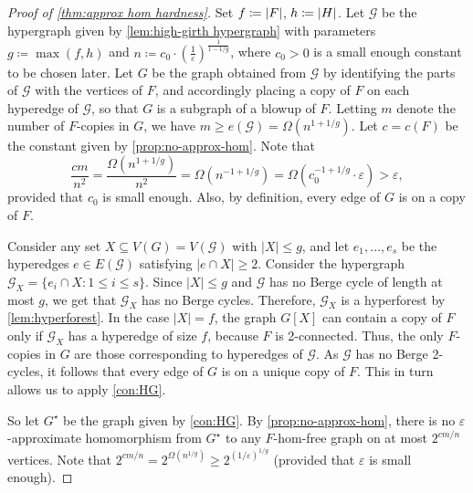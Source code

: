 \documentclass[10pt,a4paper]{amsart}
\DeclarePairedDelimiter{\abs}{\lvert}{\rvert}
\renewcommand{\geq}{\geqslant}
\renewcommand{\leq}{\leqslant}
\begin{document}
	\begin{proof}[Proof of \cref{thm:approx hom hardness}]
	Set $f \coloneqq \abs F$, $h \coloneqq \abs H$.
	Let $\mathcal{G}$ be the hypergraph given by \cref{lem:high-girth hypergraph} with parameters $g \coloneqq \max(f,h)$ and $n \coloneqq c_0\cdot (\frac{1}{\varepsilon})^{\frac{1}{1-1/g}}$, where $c_0 > 0$ is a small enough constant to be chosen later. 
	{Let $G$ be the graph obtained from $\mathcal{G}$ by identifying the parts of $\mathcal{G}$ with the vertices of $F$, and accordingly placing a copy of $F$ on each hyperedge of $\mathcal{G}$, so that $G$ is a subgraph of a blowup of $F$.} 
	Letting $m$ denote the number of $F$-copies in $G$, we have $m \geq e(\mathcal G)= \Omega(n^{1 + 1/g})$. 
	Let $c = c(F)$ be the constant given by \cref{prop:no-approx-hom}.
	Note that 
	$$
	\frac{cm}{n^2} = \frac{\Omega(n^{1+1/g})}{n^2} = \Omega(n^{-1+1/g}) = \Omega( c_0^{-1+1/g} \cdot \varepsilon ) > \varepsilon,
	$$
	provided that $c_0$ is small enough. 
    Also, by definition, every edge of $G$ is on a copy of $F$. 


    Consider any set $X \subseteq V(G) = V(\mathcal{G})$ with $|X| \leq g$, and let $e_1,\dots,e_s$ be the hyperedges $e \in E(\mathcal{G})$ satisfying $|e \cap X| \geq 2$.  Consider the hypergraph 
    $\mathcal{G}_X = \{e_i \cap X : 1 \leq i \leq s\}$. Since $|X| \leq g$ and $\mathcal{G}$ has no Berge cycle of length at most $g$, we get that $\mathcal{G}_X$ has no Berge cycles. Therefore, $\mathcal{G}_X$ is a hyperforest by \cref{lem:hyperforest}. 
    In the case $|X| = f$, the graph $G[X]$ can contain a copy of $F$ only if $\mathcal{G}_X$ has a hyperedge of size $f$, because $F$ is 2-connected.
    Thus, the only $F$-copies in $G$ are those corresponding to hyperedges of $\mathcal{G}$. 
    As $\mathcal{G}$ has no Berge 2-cycles, it follows that every edge of $G$ is on a unique copy of $F$. This in turn allows us to apply \cref{con:HG}. 
    
	So let $G^{\star}$ be the graph given by \cref{con:HG}. 
	By \cref{prop:no-approx-hom}, there is no $\varepsilon$-approximate homomorphism from $G^{\star}$ to any $F$-hom-free graph on at most $2^{cm/n}$ vertices. Note that $2^{cm/n} = 2^{\Omega(n^{1/g})} \geq 2^{(1/\varepsilon)^{1/g}}$ (provided that $\varepsilon$ is small enough). 


\end{proof}
\end{document}
